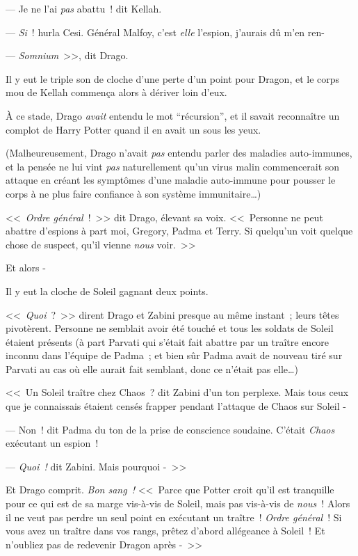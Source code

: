 --- Je ne l'ai \emph{pas} abattu~! dit Kellah.

--- \emph{Si}~! hurla Cesi. Général Malfoy, c'est \emph{elle} l'espion, j'aurais dû m'en ren-

--- \emph{Somnium}~>>, dit Drago.

Il y eut le triple son de cloche d'une perte d'un point pour Dragon, et le corps mou de Kellah commença alors à dériver loin d'eux.

À ce stade, Drago \emph{avait} entendu le mot “récursion”, et il savait reconnaître un complot de Harry Potter quand il en avait un sous les yeux.

(Malheureusement, Drago n'avait \emph{pas} entendu parler des maladies auto-immunes, et la pensée ne lui vint \emph{pas} naturellement qu'un virus malin commencerait son attaque en créant les symptômes d'une maladie auto-immune pour pousser le corps à ne plus faire confiance à son système immunitaire…)

<<~\emph{Ordre général}~!~>> dit Drago, élevant sa voix. <<~Personne ne peut abattre d'espions à part moi, Gregory, Padma et Terry. Si quelqu'un voit quelque chose de suspect, qu'il vienne \emph{nous} voir.~>>

Et alors -

Il y eut la cloche de Soleil gagnant deux points.

<<~\emph{Quoi}~?~>> dirent Drago et Zabini presque au même instant~; leurs têtes pivotèrent. Personne ne semblait avoir été touché et tous les soldats de Soleil étaient présents (à part Parvati qui s'était fait abattre par un traître encore inconnu dans l'équipe de Padma~; et bien sûr Padma avait de nouveau tiré sur Parvati au cas où elle aurait fait semblant, donc ce n'était pas elle…)

<<~Un Soleil traître chez Chaos~? dit Zabini d'un ton perplexe. Mais tous ceux que je connaissais étaient censés frapper pendant l'attaque de Chaos sur Soleil -

--- Non~! dit Padma du ton de la prise de conscience soudaine. C'était \emph{Chaos} exécutant un espion~!

--- \emph{Quoi~!} dit Zabini. Mais pourquoi -~>>

Et Drago comprit. \emph{Bon sang~!} <<~Parce que Potter croit qu'il est tranquille pour ce qui est de sa marge vis-à-vis de Soleil, mais pas vis-à-vis de \emph{nous}~! Alors il ne veut pas perdre un seul point en exécutant un traître~! \emph{Ordre général}~! Si vous avez un traître dans vos rangs, prêtez d'abord allégeance à Soleil~! Et n'oubliez pas de redevenir Dragon après -~>>

